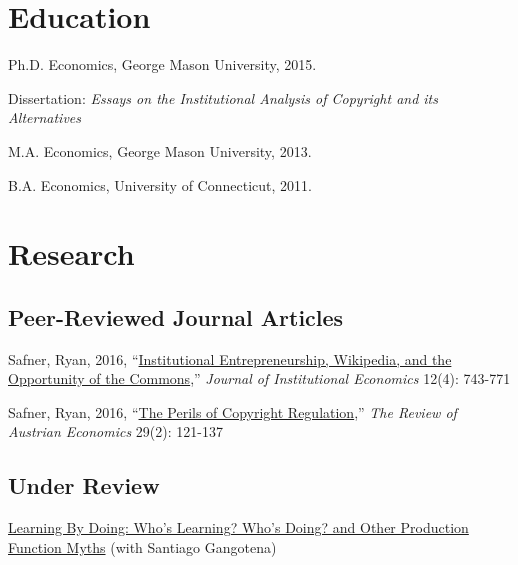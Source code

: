 \documentclass[]{article}
\renewenvironment{itemize}{
  \begin{list}{}{
    \setlength{\leftmargin}{1.5em}
  }
}{
  \end{list}
}
\begin{document}
\section*{Education}

\begin{itemize}
  \item Ph.D. Economics, George Mason University, 2015.
    \begin{itemize}
        \item Dissertation: \emph{Essays on the Institutional Analysis of Copyright and its Alternatives}
    \end{itemize} 
  \item M.A. Economics, George Mason University, 2013.
  \item B.A. Economics, University of Connecticut, 2011.
\end{itemize}

\section*{Research}

\subsection*{Peer-Reviewed Journal Articles}

\begin{itemize}
        \item Safner, Ryan, 2016, ``\href{http://papers.ssrn.com/sol3/papers.cfm?abstract_id=2564230}{Institutional Entrepreneurship, Wikipedia, and the Opportunity of the Commons},'' \emph{Journal of Institutional Economics} 12(4): 743-771 
        \item Safner, Ryan, 2016, ``\href{http://papers.ssrn.com/sol3/papers.cfm?abstract_id=2396874}{The Perils of Copyright Regulation},'' \emph{The Review of Austrian Economics} 29(2): 121-137
    \end{itemize}

\subsection*{Under Review}\begin{itemize}
    \item \href{http://papers.ssrn.com/sol3/papers.cfm?abstract_id=2626587}{Learning By Doing: Who's Learning? Who's Doing? and Other Production Function Myths} (with Santiago Gangotena)
\end{itemize}
\end{document}
